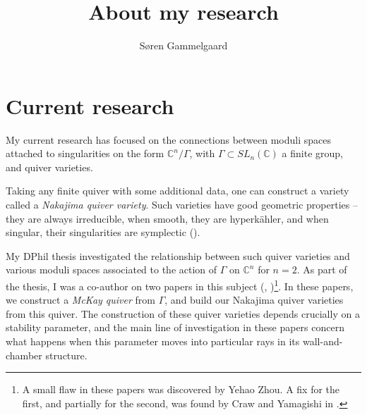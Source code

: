 \documentclass[11pt,a4paper ]{article}        %
\author{Søren Gammelgaard}
\title{About my research}                               %
\newcommand{\C}{\mathbb{C}}    						%
\begin{document}
\maketitle



\section*{Current research}
	My current research has focused on the connections between moduli spaces attached to singularities on the form $\C^n/\Gamma$, with $\Gamma\subset SL_n(\C)$ a finite group, and quiver varieties.
	
	Taking any finite quiver with some additional data, one can construct a variety called a \emph{Nakajima quiver variety}. Such varieties have good geometric properties -- they are always irreducible, when smooth, they are hyperkähler, and when singular, their singularities are symplectic (\cite{BelSche}).
	
My DPhil thesis investigated the relationship between such quiver varieties and various moduli spaces associated to the action of $ \Gamma $ on $ \C^n $ for $n=2$. As part of the thesis, I was a co-author on two papers in this subject (\cite{CGGS}, \cite{CGGS2})\footnote{A small flaw in these papers was discovered by Yehao Zhou. A fix for the first, and partially for the second, was found by Craw and Yamagishi in \cite{CrawYamagishi}.}.
In these papers, we construct a \emph{McKay quiver} from $\Gamma$, and build our Nakajima quiver varieties from this quiver. The construction of these quiver varieties depends crucially on a stability parameter, and the main line of investigation in these papers concern what happens when this parameter moves into particular rays in its wall-and-chamber structure. 
\end{document}
